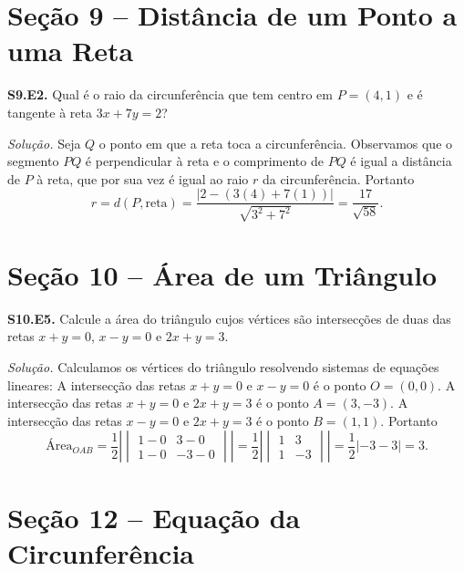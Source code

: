 \documentclass[a4paper,11pt]{article}
\begin{document}
\section*{Seção 9 -- Distância de um Ponto a uma Reta}

\textbf{S9.E2.}
Qual é o raio da circunferência que tem centro em $P = (4,1)$ e é tangente à reta $3x + 7y = 2$?

\vspace{\baselineskip}

\emph{Solução.}
Seja $Q$ o ponto em que a reta toca a circunferência.
Observamos que o segmento $PQ$ é perpendicular à reta e o comprimento de $PQ$ é igual a distância de $P$ à reta, que por sua vez é igual ao raio $r$ da circunferência.
Portanto
\[
  r = d(P,\mathrm{reta}) = \frac{|2-(3(4) + 7(1))|}{\sqrt{3^2 + 7^2}} = \frac{17}{\sqrt{58}}.
\]

\vspace{\baselineskip}

\section*{Seção 10 -- Área de um Triângulo}

\textbf{S10.E5.}
Calcule a área do triângulo cujos vértices são intersecções de duas das retas $x+y=0$, $x-y=0$ e $2x+y=3$.

\vspace{\baselineskip}

\emph{Solução.}
Calculamos os vértices do triângulo resolvendo sistemas de equações lineares:
A intersecção das retas $x+y=0$ e $x-y=0$ é o ponto $O = (0,0)$.
A intersecção das retas $x+y=0$ e $2x+y=3$ é o ponto $A = (3,-3)$.
A intersecção das retas $x-y=0$ e $2x+y=3$ é o ponto $B = (1,1)$.
Portanto
\[
  \text{Área}_{OAB} =
  \frac{1}{2} \left|
  \begin{vmatrix}
    1-0 & 3-0 \\
    1-0 & -3-0
  \end{vmatrix}
  \right|
  =
  \frac{1}{2} \left|
  \begin{vmatrix}
    1 & 3 \\
    1 & -3
  \end{vmatrix}
  \right|
  = \frac{1}{2} |-3-3| = 3.
\]

\vspace{\baselineskip}

\section*{Seção 12 -- Equação da Circunferência}
\end{document}
